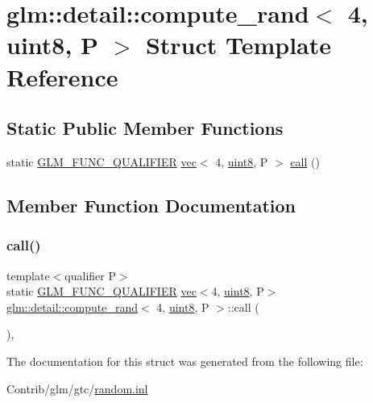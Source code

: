 \hypertarget{structglm_1_1detail_1_1compute__rand_3_014_00_01uint8_00_01_p_01_4}{}\section{glm\+:\+:detail\+:\+:compute\+\_\+rand$<$ 4, uint8, P $>$ Struct Template Reference}
\label{structglm_1_1detail_1_1compute__rand_3_014_00_01uint8_00_01_p_01_4}
\subsection*{Static Public Member Functions}
\begin{DoxyCompactItemize}
\item 
static \mbox{\hyperlink{setup_8hpp_a33fdea6f91c5f834105f7415e2a64407}{G\+L\+M\+\_\+\+F\+U\+N\+C\+\_\+\+Q\+U\+A\+L\+I\+F\+I\+ER}} \mbox{\hyperlink{structglm_1_1vec}{vec}}$<$ 4, \mbox{\hyperlink{namespaceglm_1_1detail_aef2588f97d090cc19fbbe0c74fe17c8f}{uint8}}, P $>$ \mbox{\hyperlink{structglm_1_1detail_1_1compute__rand_3_014_00_01uint8_00_01_p_01_4_ad77b64fbdc24b387174b436980e33a8c}{call}} ()
\end{DoxyCompactItemize}


\subsection{Member Function Documentation}
\mbox{\label{structglm_1_1detail_1_1compute__rand_3_014_00_01uint8_00_01_p_01_4_ad77b64fbdc24b387174b436980e33a8c}} 
\subsubsection{\texorpdfstring{call()}{call()}}
{\footnotesize\ttfamily template$<$qualifier P$>$ \\
static \mbox{\hyperlink{setup_8hpp_a33fdea6f91c5f834105f7415e2a64407}{G\+L\+M\+\_\+\+F\+U\+N\+C\+\_\+\+Q\+U\+A\+L\+I\+F\+I\+ER}} \mbox{\hyperlink{structglm_1_1vec}{vec}}$<$4, \mbox{\hyperlink{namespaceglm_1_1detail_aef2588f97d090cc19fbbe0c74fe17c8f}{uint8}}, P$>$ \mbox{\hyperlink{structglm_1_1detail_1_1compute__rand}{glm\+::detail\+::compute\+\_\+rand}}$<$ 4, \mbox{\hyperlink{namespaceglm_1_1detail_aef2588f97d090cc19fbbe0c74fe17c8f}{uint8}}, P $>$\+::call (\begin{DoxyParamCaption}{ }\end{DoxyParamCaption})\hspace{0.3cm}{\ttfamily [inline]}, {\ttfamily [static]}}



The documentation for this struct was generated from the following file\+:\begin{DoxyCompactItemize}
\item 
Contrib/glm/gtc/\mbox{\hyperlink{random_8inl}{random.\+inl}}\end{DoxyCompactItemize}
